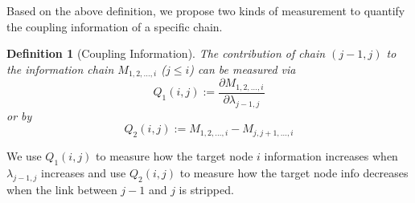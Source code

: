 \documentclass[conference]{IEEEtran}
\newtheorem{definition}{Definition}
\begin{document}
Based on the above definition, we propose two kinds of measurement to quantify the coupling information of a specific chain.
\begin{definition}[Coupling Information] 
The contribution of chain $(j-1,j)$ to the information chain $M_{1,2,\dots,i}$ ($j\leq i$) can be measured via
\begin{equation}
Q_1(i,j):=\frac{\partial M_{1,2,\dots,i}}{\partial \lambda_{j-1,j}}
\end{equation}
or by
\begin{equation}
Q_2(i,j):=M_{1,2,\dots,i}-M_{j,j+1,\dots,i}
\end{equation}
\end{definition}
We use $Q_1(i,j)$ to measure how the target node $i$ information increases when $\lambda_{j-1,j}$ increases and 
use $Q_2(i,j)$ to measure how the target node info decreases when the link between $j-1$ and $j$ is stripped.
\end{document}
